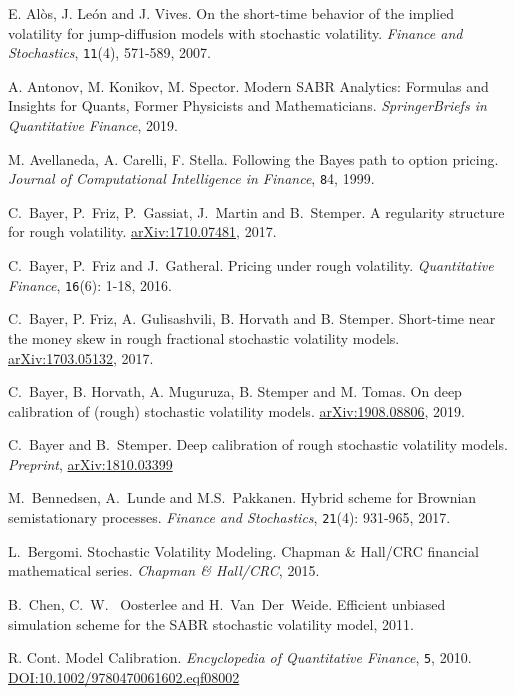 \documentclass{article}
\theoremstyle{remark}
\begin{document}
\appendix
\newpage
\begin{thebibliography}{99}
E. Al\`os, J. Le\'on and J. Vives. 
On the short-time behavior of the implied volatility for jump-diffusion models with stochastic volatility. 
\textit{Finance and Stochastics}, {\tt 11}(4), 571-589, 2007.

A. Antonov, M. Konikov, M. Spector.
Modern SABR Analytics: Formulas and Insights for Quants, Former Physicists and Mathematicians.
\textit{SpringerBriefs in Quantitative Finance}, 2019.

M. Avellaneda, A. Carelli, F. Stella.
Following the Bayes path to option pricing.
\textit{Journal of Computational Intelligence in Finance}, {\tt 8}4, 1999.

C.~Bayer, P.~Friz, P.~Gassiat, J.~Martin and B.~Stemper.
A regularity structure for rough volatility. 
\href{https://arxiv.org/abs/1710.07481}{arXiv:1710.07481}, 2017.

C.~Bayer, P.~Friz  and J.~Gatheral.
Pricing under rough volatility. 
\textit{Quantitative Finance}, {\tt 16}(6): 1-18, 2016.

C.~Bayer, P. Friz, A. Gulisashvili, B. Horvath and B. Stemper.
Short-time near the money skew in rough fractional stochastic volatility models.
\href{https://arxiv.org/abs/1703.05132}{arXiv:1703.05132}, 2017.

C.~Bayer, B. Horvath, A. Muguruza, B. Stemper and M. Tomas.
On deep calibration of (rough) stochastic volatility models.
\href{https://arxiv.org/abs/1908.08806}{arXiv:1908.08806}, 2019.

C.~Bayer and B.~Stemper. Deep calibration of rough stochastic volatility models. \textit{Preprint}, \href{https://arxiv.org/pdf/1810.03399.pdf}{arXiv:1810.03399}

 M.~Bennedsen, A.~Lunde and M.S.~Pakkanen. 
Hybrid scheme for Brownian semistationary processes. 
\textit{Finance and Stochastics}, {\tt 21}(4): 931-965, 2017.

L.~Bergomi. Stochastic Volatility Modeling.
Chapman \& Hall/CRC financial mathematical series.  \textit{Chapman \& Hall/CRC}, 2015.

 B.~Chen, C.~W. ~Oosterlee and H.~Van~Der~Weide. Efficient unbiased simulation scheme for the SABR stochastic volatility model, 2011.

R. Cont.
Model Calibration.
\textit{Encyclopedia of Quantitative Finance},
{\tt 5}, 2010. \href{https://doi.org/10.1002/9780470061602.eqf08002
}{DOI:10.1002/9780470061602.eqf08002}


\end{thebibliography}
\end{document}

